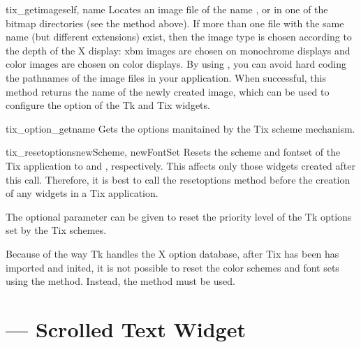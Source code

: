 \begin{methoddesc}{tix_getimage}{self, name}
Locates an image file of the name ,  or
 in one of the bitmap directories (see the
 method above). If more than one file with
the same name (but different extensions) exist, then the image type is
chosen according to the depth of the X display: xbm images are chosen
on monochrome displays and color images are chosen on color
displays. By using , you can avoid hard coding
the pathnames of the image files in your application. When successful,
this method returns the name of the newly created image, which can be
used to configure the  option of the Tk and Tix widgets.
\end{methoddesc}

\begin{methoddesc}{tix_option_get}{name}
Gets the options manitained by the Tix scheme mechanism.
\end{methoddesc}

\begin{methoddesc}{tix_resetoptions}{newScheme, newFontSet}
Resets the scheme and fontset of the Tix application to
 and , respectively.  This affects only
those widgets created after this call.  Therefore, it is best to call
the resetoptions method before the creation of any widgets in a Tix
application.

The optional parameter  can be given to reset the
priority level of the Tk options set by the Tix schemes.

Because of the way Tk handles the X option database, after Tix has
been has imported and inited, it is not possible to reset the color
schemes and font sets using the  method.
Instead, the  method must be used.
\end{methoddesc}



\section{ ---
         Scrolled Text Widget}


